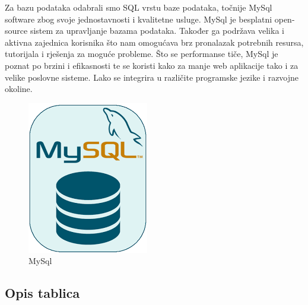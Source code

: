 		\hspace*{2em}
     	Za bazu podataka odabrali smo SQL vrstu baze podataka, točnije MySql software zbog svoje jednostavnosti i kvalitetne usluge. MySql je besplatni open-source sistem za upravljanje bazama podataka. Također ga podržava velika i aktivna zajednica korisnika što nam omogućava brz pronalazak potrebnih resursa, tutorijala i rješenja za moguće probleme. Što se performanse tiče, MySql je poznat po brzini i efikasnosti te se koristi kako za manje web aplikacije tako i za velike poslovne sisteme. Lako se integrira u različite programske jezike i razvojne okoline.
     	
     	\begin{figure}[H]
     		\includegraphics[scale=1]{slike/MySql.PNG} %
     		\centering
     		\caption{MySql}
     		\label{fig:promjene}
     	\end{figure}
     	
		
		
			\subsection{Opis tablica}
			
